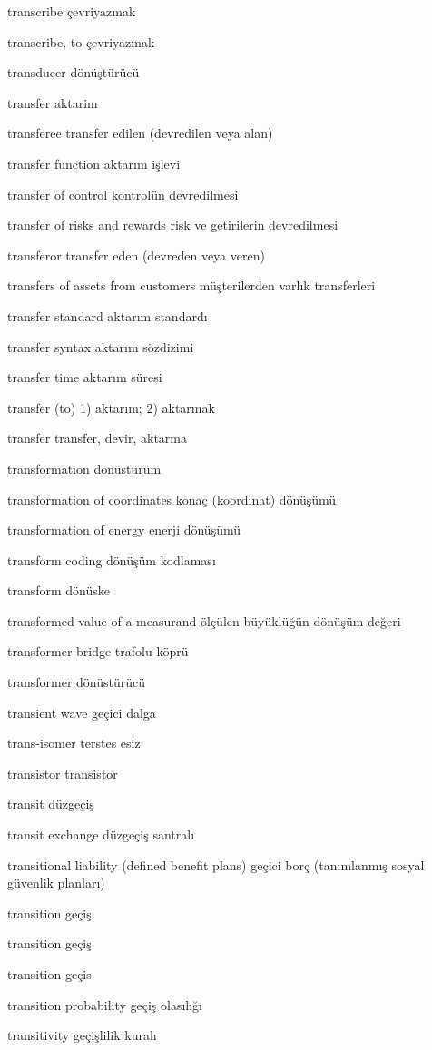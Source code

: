 \documentclass[12pt,fleqn]{article}\usepackage{../../common}
\begin{document}
transcribe çevriyazmak

transcribe, to çevriyazmak

transducer dönüştürücü

transfer aktarim

transferee transfer edilen (devredilen veya alan)

transfer function aktarım işlevi

transfer of control kontrolün devredilmesi

transfer of risks and rewards risk ve getirilerin devredilmesi

transferor transfer eden (devreden veya veren)

transfers of assets from customers müşterilerden varlık transferleri

transfer standard aktarım standardı

transfer syntax aktarım sözdizimi

transfer time aktarım süresi

transfer (to) 1) aktarım; 2) aktarmak

transfer transfer, devir, aktarma

transformation dönüstürüm

transformation of coordinates konaç (koordinat) dönüşümü

transformation of energy enerji dönüşümü

transform coding dönüşüm kodlaması

transform dönüske

transformed value of a measurand ölçülen büyüklüğün dönüşüm değeri

transformer bridge trafolu köprü

transformer dönüstürücü

transient wave geçici dalga

trans-isomer terstes esiz

transistor transistor

transit düzgeçiş

transit exchange düzgeçiş santralı

transitional liability (defined benefit plans) geçici borç (tanımlanmış sosyal güvenlik planları)

transition geçiş

transition geçiş

transition geçis

transition probability geçiş olasılığı

transitivity geçişlilik kuralı
\end{document}

